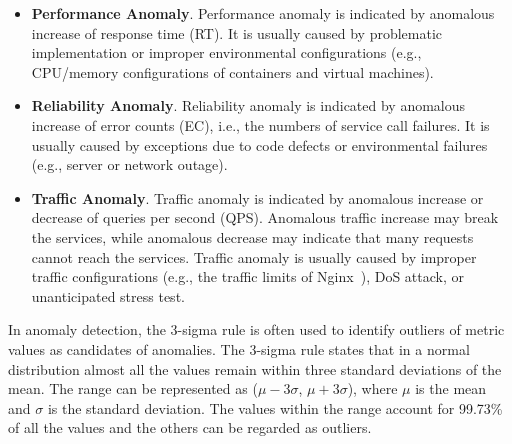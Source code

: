 \begin{itemize}
\item  \textbf{Performance Anomaly}.
Performance anomaly is indicated by anomalous increase of response time (RT).
It is usually caused by problematic implementation or improper environmental configurations (e.g., CPU/memory configurations of containers and virtual machines).

\item  \textbf{Reliability Anomaly}.
Reliability anomaly is indicated by anomalous increase of error counts (EC), i.e., the numbers of service call failures.
It is usually caused by exceptions due to code defects or environmental failures (e.g., server or network outage).

\item  \textbf{Traffic Anomaly}.
Traffic anomaly is indicated by anomalous increase or decrease of queries per second (QPS).
Anomalous traffic increase may break the services, while anomalous decrease may indicate that many requests cannot reach the services.
Traffic anomaly is usually caused by improper traffic configurations (e.g., the traffic limits of Nginx~\cite{nginx}), DoS attack, or unanticipated stress test.

\end{itemize}

In anomaly detection, the 3-sigma rule is often used to identify outliers of metric values as candidates of anomalies. 
The 3-sigma rule states that in a normal distribution almost all the values remain within three standard deviations of the mean.
The range can be represented as ($\mu- 3\sigma$, $\mu + 3\sigma$), where $\mu$ is the mean and $\sigma$ is the standard deviation.
The values within the range account for 99.73\% of all the values and the others can be regarded as outliers.

